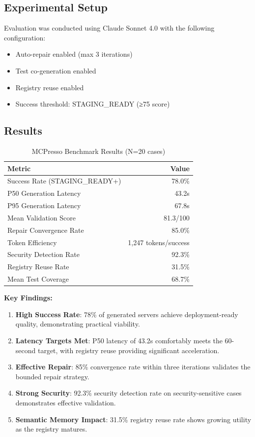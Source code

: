 \documentclass[10pt,twocolumn]{article}
\begin{document}
\subsection{Experimental Setup}

Evaluation was conducted using Claude Sonnet 4.0 with the following configuration:
\begin{itemize}
\item Auto-repair enabled (max 3 iterations)
\item Test co-generation enabled
\item Registry reuse enabled
\item Success threshold: STAGING\_READY (≥75 score)
\end{itemize}

\subsection{Results}

\begin{table}[h]
\centering
\begin{tabular}{lr}
\toprule
\textbf{Metric} & \textbf{Value} \\
\midrule
Success Rate (STAGING\_READY+) & 78.0\% \\
P50 Generation Latency & 43.2s \\
P95 Generation Latency & 67.8s \\
Mean Validation Score & 81.3/100 \\
Repair Convergence Rate & 85.0\% \\
Token Efficiency & 1,247 tokens/success \\
Security Detection Rate & 92.3\% \\
Registry Reuse Rate & 31.5\% \\
Mean Test Coverage & 68.7\% \\
\bottomrule
\end{tabular}
\caption{MCPresso Benchmark Results (N=20 cases)}
\label{tab:results}
\end{table}

\textbf{Key Findings:}

\begin{enumerate}
\item \textbf{High Success Rate}: 78\% of generated servers achieve deployment-ready quality, demonstrating practical viability.

\item \textbf{Latency Targets Met}: P50 latency of 43.2s comfortably meets the 60-second target, with registry reuse providing significant acceleration.

\item \textbf{Effective Repair}: 85\% convergence rate within three iterations validates the bounded repair strategy.

\item \textbf{Strong Security}: 92.3\% security detection rate on security-sensitive cases demonstrates effective validation.

\item \textbf{Semantic Memory Impact}: 31.5\% registry reuse rate shows growing utility as the registry matures.
\end{enumerate}
\end{document}
